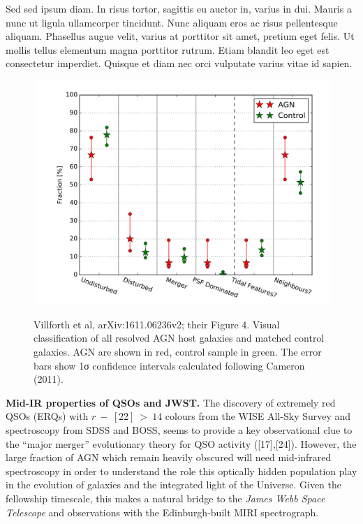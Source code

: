 \documentclass[11pt,epsf]{article}
\begin{document}
\smallskip
\smallskip
\noindent
Sed sed ipsum diam. In risus tortor, sagittis eu auctor in, varius in
dui. Mauris a nunc ut ligula ullamcorper tincidunt. Nunc aliquam eros
ac risus pellentesque aliquam. Phasellus augue velit, varius at
porttitor sit amet, pretium eget felis. Ut mollis tellus elementum
magna porttitor rutrum. Etiam blandit leo eget est consectetur
imperdiet. Quisque et diam nec orci vulputate varius vitae id sapien.


\begin{figure}[h]
  \begin{center}
   \hspace{-0.5cm}
    \includegraphics[height=8.5cm,width=12.2cm]
   {figs/Villforth_161106236v2_Fig4_right.png}
    \vspace{-10pt}
   \caption{Villforth et al, arXiv:1611.06236v2; their Figure 4. 
     Visual classification of all resolved AGN host galaxies and
     matched control galaxies. AGN are shown in red, control sample in
     green. The error bars show 1σ confidence intervals calculated
     following Cameron (2011).
}
  \vspace{-14pt}
 \label{figtest-fig}
\end{center}
\end{figure}


\smallskip
\smallskip
\noindent
{\bf Mid-IR properties of QSOs and JWST.} 
The discovery of extremely red QSOs (ERQs) with $r~-~[22]~>~14$
colours from the WISE All-Sky Survey and spectroscopy from SDSS and
BOSS, seems to provide a key observational clue to the ``major
merger'' evolutionary theory for QSO activity ([17],[24]).
However, the large fraction of AGN which remain heavily obscured will
need mid-infrared spectroscopy in order to understand the role this
optically hidden population play in the evolution of galaxies and the
integrated light of the Universe. Given the fellowship timescale, this
makes a natural bridge to the {\it James Webb Space Telescope} and
observations with the Edinburgh-built MIRI spectrograph.
\end{document}
